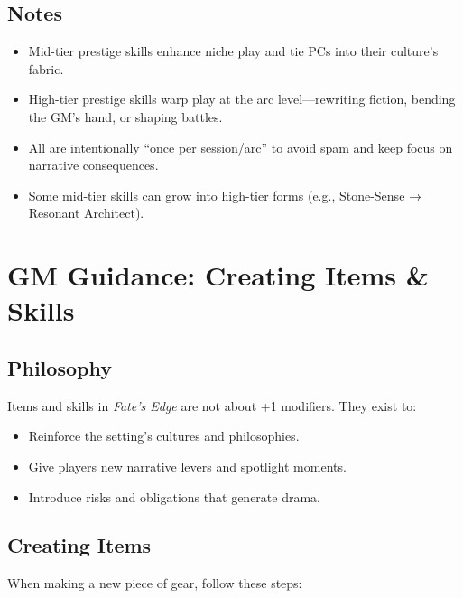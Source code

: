 \documentclass[12pt]{book}
\begin{document}
\subsection*{Notes}
\begin{itemize}
  \item Mid-tier prestige skills enhance niche play and tie PCs into their culture’s fabric.  
  \item High-tier prestige skills warp play at the arc level—rewriting fiction, bending the GM’s hand, or shaping battles.  
  \item All are intentionally “once per session/arc” to avoid spam and keep focus on narrative consequences.  
  \item Some mid-tier skills can grow into high-tier forms (e.g., Stone-Sense → Resonant Architect).  
\end{itemize}

\section*{GM Guidance: Creating Items \& Skills}

\subsection*{Philosophy}
Items and skills in \textit{Fate’s Edge} are not about +1 modifiers.  
They exist to:
\begin{itemize}
  \item Reinforce the setting’s cultures and philosophies.
  \item Give players new narrative levers and spotlight moments.
  \item Introduce risks and obligations that generate drama.
\end{itemize}

\subsection*{Creating Items}
When making a new piece of gear, follow these steps:
\end{document}
